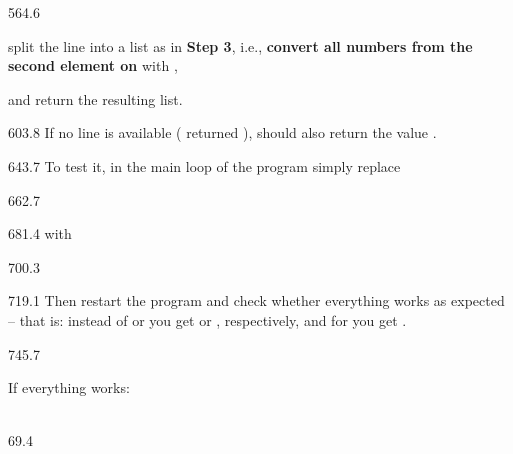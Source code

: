 \documentclass{aslab}
\begin{document}
\begin{region}[x=74.7,right=0,pitch=13.6]{564.6}
\begin{dotlist}
\item split the line into a list as in \textbf{Step 3}, i.e., \textbf{convert
  all numbers from the second element on} with ,
\item and return the resulting list.
\end{dotlist}
\end{region}

\begin{region}[x=74.7,right=0,pitch=13.5]{603.8}
If no line is available ( returned ),
 should also return the value .
\end{region}

\begin{region}[x=74.7,right=0]{643.7}
To test it, in the main loop of the program simply replace
\end{region}

\begin{region}[x=74.7,right=0]{662.7}
\end{region}

\begin{region}[x=74.7,right=0]{681.4}
with
\end{region}

\begin{region}[x=74.7,right=0]{700.3}
\end{region}

\begin{region}[x=74.7,right=0,pitch=13.4]{719.1}
Then restart the program and check whether everything works as expected --
that is: instead of  or  you get \code{['A']} or
\code{['a']}, respectively, and for  you get
\code{['X', 523]}.
\end{region}

\begin{region}[pitch=13.5]{745.7}
\begin{tasks}[start=2]
\item If everything works:\\
  \\[-0.3bp]
\end{tasks}
\end{region}

\nextpage
\begin{region}{69.4}
\end{region}
\end{document}
